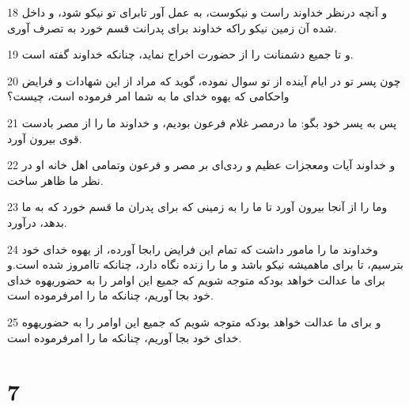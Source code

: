 \par 18 و آنچه درنظر خداوند راست و نیکوست، به عمل آور تابرای تو نیکو شود، و داخل شده آن زمین نیکو راکه خداوند برای پدرانت قسم خورد به تصرف آوری.
\par 19 و تا جمیع دشمنانت را از حضورت اخراج نماید، چنانکه خداوند گفته است.
\par 20 چون پسر تو در ایام آینده از تو سوال نموده، گوید که مراد از این شهادات و فرایض واحکامی که یهوه خدای ما به شما امر فرموده است، چیست؟
\par 21 پس به پسر خود بگو: ما درمصر غلام فرعون بودیم، و خداوند ما را از مصر بادست قوی بیرون آورد.
\par 22 و خداوند آیات ومعجزات عظیم و ردی‌ای بر مصر و فرعون وتمامی اهل خانه او در نظر ما ظاهر ساخت.
\par 23 وما را از آنجا بیرون آورد تا ما را به زمینی که برای پدران ما قسم خورد که به ما بدهد، درآورد.
\par 24 وخداوند ما را مامور داشت که تمام این فرایض رابجا آورده، از یهوه خدای خود بترسیم، تا برای ماهمیشه نیکو باشد و ما را زنده نگاه دارد، چنانکه تاامروز شده است.و برای ما عدالت خواهد بودکه متوجه شویم که جمیع این اوامر را به حضوریهوه خدای خود بجا آوریم، چنانکه ما را امرفرموده است.
\par 25 و برای ما عدالت خواهد بودکه متوجه شویم که جمیع این اوامر را به حضوریهوه خدای خود بجا آوریم، چنانکه ما را امرفرموده است.
 
\chapter{7}


